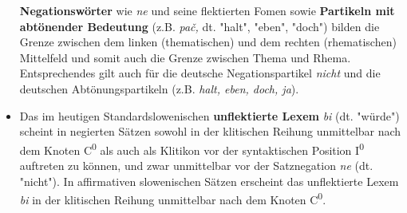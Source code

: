 \begin{itemize}
  \textbf{Negationswörter} wie \emph{ne} und seine flektierten Fomen
  sowie \textbf{Partikeln mit abtönender Bedeutung} (z.B. \emph{pač,}
  dt. "halt", "eben", "doch") bilden die Grenze zwischen dem linken
  (thematischen) und dem rechten (rhematischen) Mittelfeld und somit
  auch die Grenze zwischen Thema und Rhema. Entsprechendes gilt auch für
  die deutsche Negationspartikel \emph{nicht} und die deutschen
  Abtönungspartikeln (z.B. \emph{halt, eben, doch, ja}).
\item
  Das im heutigen Standardslowenischen \textbf{unflektierte Lexem}
  \emph{bi} (dt. "würde") scheint in negierten Sätzen sowohl in der
  klitischen Reihung unmittelbar nach dem Knoten C\textsuperscript{0}
  als auch als Klitikon vor der syntaktischen Position
  I\textsuperscript{0} auftreten zu können, und zwar unmittelbar vor der
  Satznegation \emph{ne} (dt. "nicht"). In affirmativen slowenischen
  Sätzen erscheint das unflektierte Lexem \emph{bi} in der klitischen
  Reihung unmittelbar nach dem Knoten C\textsuperscript{0}.
\end{itemize}
